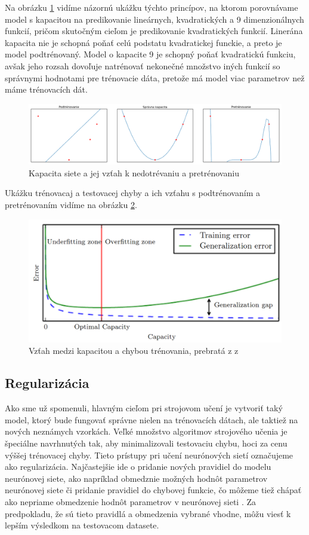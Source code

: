 \indent Na obrázku \ref{fig:capacity} vidíme názornú ukážku týchto princípov, na ktorom porovnávame model s kapacitou na predikovanie lineárnych, kvadratických a 9 dimenzionálnych funkcií, pričom skutočným cieľom je predikovanie kvadratických funkcií. Linerána kapacita nie je schopná poňať celú podstatu kvadratickej funckie, a preto je model podtrénovaný. Model o kapacite 9 je schopný poňať kvadratickú funkciu, avšak jeho rozsah dovoľuje natrénovať nekonečné množstvo iných funkcií so správnymi hodnotami pre trénovacie dáta, pretože má model viac parametrov než máme trénovacích dát. 

\begin{figure}[H]
	\centering
	\includegraphics[width=1\linewidth]{img/capacity}
	\caption{Kapacita siete a jej vzťah k nedotrévaniu a pretrénovaniu}
	\label{fig:capacity}
\end{figure}

\indent Ukážku trénovacaj a testovacej chyby a ich vzťahu s podtrénovaním a pretrénovaním vidíme na obrázku \ref{fig:errors}.

\begin{figure}[H]
	\centering
	\includegraphics[width=.5\linewidth]{img/errors}
	\caption{Vzťah medzi kapacitou a chybou trénovania,  prebratá z z\cite[p.~115]{goodfellow2016deep}}
	\label{fig:errors}
\end{figure}

\subsection{Regularizácia}
Ako sme už spomenuli, hlavným cieľom pri strojovom učení je vytvoriť taký model, ktorý bude fungovať správne nielen na trénovacích dátach, ale taktiež na nových neznámych vzorkách.
Veľké množstvo algoritmov strojového učenia je špeciálne navrhnutých tak, aby minimalizovali testovaciu chybu, hoci za cenu výššej trénovacej chyby.
Tieto prístupy pri učení neurónových sietí označujeme ako regularizácia\cite{nielsen2015chapter}.
Najčastejšie ide o pridanie nových pravidiel do modelu neurónovej siete, ako napríklad obmedznie možných hodnôt parametrov neurónovej siete či pridanie pravidiel do chybovej funkcie, čo môžeme tiež chápať ako nepriame obmedzenie hodnôt parametrov v neurónovej sieti \cite{goodfellow2016deep}.
Za predpokladu, že sú tieto pravidlá a obmedzenia vybrané vhodne, môžu viesť k lepším výsledkom na testovacom datasete.

